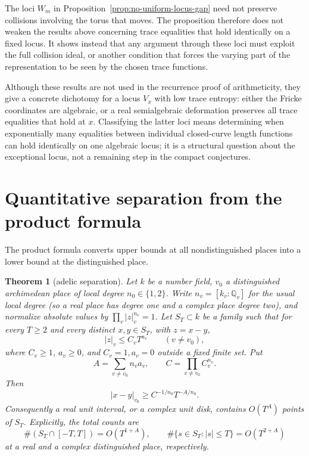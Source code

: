 \documentclass[11pt,reqno]{amsart}
\newtheorem{theorem}{Theorem}[section]
\theoremstyle{definition}
\theoremstyle{remark}
\newcommand{\Q}{\mathbb Q}
\begin{document}
The loci \(W_m\) in Proposition~\ref{prop:no-uniform-locus-gap} need not
preserve collisions involving the torus that moves.  The proposition
therefore does not weaken the results above concerning trace equalities that
hold identically on a fixed locus.  It shows
instead that any argument through these loci must exploit the full collision ideal,
or another condition that forces the varying part of the representation to
be seen by the chosen trace functions.

Although these results are not used in the recurrence proof of arithmeticity,
they give a concrete dichotomy for a locus \(V_x\) with low trace entropy:
either the Fricke coordinates are algebraic, or a real semialgebraic
deformation preserves all trace equalities that hold at \(x\).  Classifying the latter loci
means determining when exponentially many equalities between individual
closed-curve length functions can hold identically on one algebraic locus;
it is a structural question about the exceptional locus, not a remaining
step in the compact conjectures.

\section{Quantitative separation from the product formula}

The product formula converts upper bounds at all nondistinguished places into
a lower bound at the distinguished place.

\begin{theorem}[adelic separation]\label{thm:adelic}
Let \(k\) be a number field, \(v_0\) a distinguished archimedean place of local
degree \(n_0\in\{1,2\}\).  Write \(n_v=[k_v:\Q_v]\) for the usual local
degree (so a real place has degree one and a complex place degree two), and
normalize absolute values by
\(\prod_v|z|_v^{n_v}=1\).  Let \(S_T\subset k\) be a family such that for every
\(T\ge2\) and every distinct \(x,y\in S_T\), with \(z=x-y\),
\[
 |z|_v\le C_vT^{a_v}\qquad(v\ne v_0),
\tag{14.1}
\]
where \(C_v\ge1\), \(a_v\ge0\), and \(C_v=1,a_v=0\) outside a fixed finite
set.  Put
\[
 A=\sum_{v\ne v_0}n_va_v,
 \qquad C=\prod_{v\ne v_0}C_v^{n_v}.
\]
Then
\[
 |x-y|_{v_0}\ge C^{-1/n_0}T^{-A/n_0}.
\tag{14.2}
\]
Consequently a real unit interval, or a complex unit disk, contains
\(O(T^A)\) points of \(S_T\).  Explicitly, the total counts are
\[
 \#(S_T\cap[-T,T])=O(T^{1+A}),\qquad
 \#\{s\in S_T:|s|\le T\}=O(T^{2+A})
\tag{14.3}
\]
at a real and a complex distinguished place, respectively.
\end{theorem}
\end{document}
